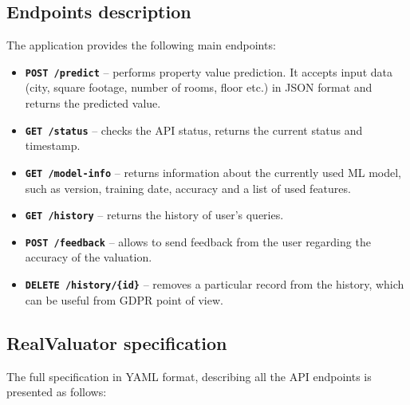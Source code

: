 \documentclass{article}
\begin{document}
\subsection{Endpoints description}

The application provides the following main endpoints:

\begin{itemize}
\item \textbf{\texttt{POST /predict}} – performs property value prediction. It accepts input data (city, square footage, number of rooms, floor etc.) in JSON format and returns the predicted value.
\item \textbf{\texttt{GET /status}} – checks the API status, returns the current status and timestamp.
\item \textbf{\texttt{GET /model-info}} – returns information about the currently used ML model, such as version, training date, accuracy and a list of used features.
\item \textbf{\texttt{GET /history}} – returns the history of user's queries.
\item \textbf{\texttt{POST /feedback}} – allows to send feedback from the user regarding the accuracy of the valuation.
\item \textbf{\texttt{DELETE /history/\{id\}}} – removes a particular record from the history, which can be useful from GDPR point of view.
\end{itemize}

\subsection{RealValuator specification}

The full specification in YAML format, describing all the API endpoints is presented as follows:
\end{document}

